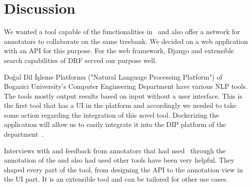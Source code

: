 \section{Discussion}
\label{sec:discussion}

We wanted a tool capable of the functionalities in \boatvone\ and also offer a network for annotators to collaborate on the same treebank.
We decided on a web application with an API for this purpose.
For the web framework, Django and extensible search capabilities of DRF served our purpose well.

Doğal Dil İşleme Platformu ("Natural Language Processing Platform") of Bogazici University's Computer Engineering Department have various NLP tools.
The tools mostly output results based on input without a user interface.
This is the first tool that has a UI in the platform and accordingly we needed to take some action regarding the integration of this novel tool.
Dockerizing the application will allow us to easily integrate it into the DIP platform of the department~\cite{DIP}.

Interviews with and feedback from annotators that had used \boatvone\ through the annotation of the \bountreebank{} and also had used other tools have been very helpful.
They shaped every part of the tool, from designing the API to the annotation view in the UI part.
It is an extensible tool and can be tailored for other use cases.
